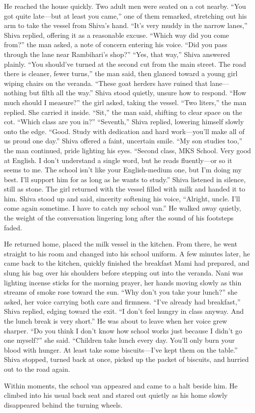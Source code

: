 He reached the house quickly. Two adult men were seated on a cot nearby. ``You got quite late—but at least you came,'' one of them remarked, stretching out his arm to take the vessel from Shiva's hand. ``It's very muddy in the narrow lanes,'' Shiva replied, offering it as a reasonable excuse. ``Which way did you come from?'' the man asked, a note of concern entering his voice. ``Did you pass through the lane near Rambihari's shop?'' ``Yes, that way,'' Shiva answered plainly. ``You should've turned at the second cut from the main street. The road there is cleaner, fewer turns,'' the man said, then glanced toward a young girl wiping chairs on the veranda. ``These goat herders have ruined that lane—nothing but filth all the way.'' Shiva stood quietly, unsure how to respond. ``How much should I measure?'' the girl asked, taking the vessel. ``Two liters,'' the man replied. She carried it inside. ``Sit,'' the man said, shifting to clear space on the cot. ``Which class are you in?'' ``Seventh,'' Shiva replied, lowering himself slowly onto the edge. ``Good. Study with dedication and hard work—you'll make all of us proud one day.'' Shiva offered a faint, uncertain smile. ``My son studies too,'' the man continued, pride lighting his eyes. ``Second class, MKS School. Very good at English. I don't understand a single word, but he reads fluently—or so it seems to me. The school isn't like your English-medium one, but I'm doing my best. I'll support him for as long as he wants to study.'' Shiva listened in silence, still as stone. The girl returned with the vessel filled with milk and handed it to him. Shiva stood up and said, sincerity softening his voice, ``Alright, uncle. I'll come again sometime. I have to catch my school van.'' He walked away quietly, the weight of the conversation lingering long after the sound of his footsteps faded.

He returned home, placed the milk vessel in the kitchen. From there, he went straight to his room and changed into his school uniform. A few minutes later, he came back to the kitchen, quickly finished the breakfast Mami had prepared, and slung his bag over his shoulders before stepping out into the veranda. Nani was lighting incense sticks for the morning prayer, her hands moving slowly as thin streams of smoke rose toward the sun. ``Why don't you take your lunch?'' she asked, her voice carrying both care and firmness. ``I've already had breakfast,'' Shiva replied, edging toward the exit. ``I don't feel hungry in class anyway. And the lunch break is very short.'' He was about to leave when her voice grew sharper. ``Do you think I don't know how school works just because I didn't go one myself?'' she said. ``Children take lunch every day. You'll only burn your blood with hunger. At least take some biscuits—I've kept them on the table.'' Shiva stopped, turned back at once, picked up the packet of biscuits, and hurried out to the road again.

Within moments, the school van appeared and came to a halt beside him. He climbed into his usual back seat and stared out quietly as his home slowly disappeared behind the turning wheels.
